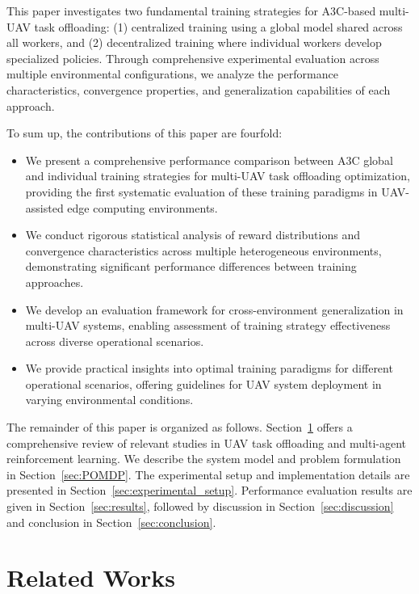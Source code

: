 \documentclass[journal]{IEEEtran}
\begin{document}
This paper investigates two fundamental training strategies for A3C-based multi-UAV task offloading: (1) centralized training using a global model shared across all workers, and (2) decentralized training where individual workers develop specialized policies. Through comprehensive experimental evaluation across multiple environmental configurations, we analyze the performance characteristics, convergence properties, and generalization capabilities of each approach.

To sum up, the contributions of this paper are fourfold: 
\begin{itemize}
    \item We present a comprehensive performance comparison between A3C global and individual training strategies for multi-UAV task offloading optimization, providing the first systematic evaluation of these training paradigms in UAV-assisted edge computing environments.
    \item We conduct rigorous statistical analysis of reward distributions and convergence characteristics across multiple heterogeneous environments, demonstrating significant performance differences between training approaches.
    \item We develop an evaluation framework for cross-environment generalization in multi-UAV systems, enabling assessment of training strategy effectiveness across diverse operational scenarios.
    \item We provide practical insights into optimal training paradigms for different operational scenarios, offering guidelines for UAV system deployment in varying environmental conditions.
\end{itemize}

The remainder of this paper is organized as follows. Section~\ref{sec:related_work} offers a comprehensive review of relevant studies in UAV task offloading and multi-agent reinforcement learning. We describe the system model and problem formulation in Section~\ref{sec:POMDP}. The experimental setup and implementation details are presented in Section~\ref{sec:experimental_setup}. Performance evaluation results are given in Section~\ref{sec:results}, followed by discussion in Section~\ref{sec:discussion} and conclusion in Section~\ref{sec:conclusion}.

\section{Related Works}
\label{sec:related_work}
\end{document}
